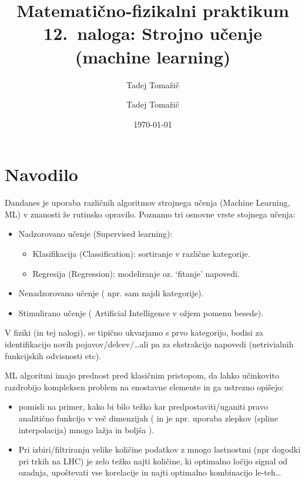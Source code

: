 \documentclass[slovene,11pt,a4paper]{article}
\title{
\sc\large Matematično-fizikalni praktikum\\
\bigskip
\bf\Large 12.~naloga: Strojno učenje (machine learning)
}
\author{Tadej Tomažič}
\date{}
\begin{document}
\author{Tadej Tomažič}
\date{\today}

\maketitle

\newpage
{}
\tableofcontents
\listoffigures
\newpage
\vspace{-1cm}
\section{Navodilo}
\vspace{-1cm}

Dandanes je uporaba različnih algoritmov strojnega učenja (Machine Learning, ML) v 
znanosti že rutinsko opravilo. Poznamo tri osnovne vrste stojnega učenja:
\begin{itemize}
  \item Nadzorovano učenje (Supervised learning):
  \begin{itemize}
    \item Klasifikacija (Classification): sortiranje v različne kategorije.
    \item Regresija (Regression): modeliranje oz. `fitanje' napovedi.
  \end{itemize}
  \item Nenadzorovano učenje ( npr. sam najdi kategorije).
  \item Stimulirano učenje ( Artificial Intelligence v ožjem pomenu besede).
\end{itemize}
V fiziki (in tej nalogi), se tipično ukvarjamo s prvo kategorijo, bodisi za identifikacijo novih pojavov/delcev/\ldots ali pa za ekstrakcijo napovedi (netrivialnih funkcijskih odvisnosti etc).

ML algoritmi imajo prednost pred klasičnim pristopom, da lahko učinkovito razdrobijo kompleksen problem na enostavne elemente in ga ustrezno opišejo:
\begin{itemize}
  \item pomisli na primer, kako bi bilo težko kar predpostaviti/uganiti 
  pravo analitično funkcijo v več dimenzijah ( in je npr. uporaba zlepkov 
  (spline interpolacija) mnogo lažja in boljša ).
  \item Pri izbiri/filtriranju velike količine podatkov z mnogo lastnostmi 
  (npr dogodki pri trkih na LHC) je zelo težko najti količine, ki optimalno 
  ločijo signal od ozadnja, upoštevati vse korelacije in najti optimalno kombinacijo 
  le-teh\ldots
\end{itemize} 
\end{document}
